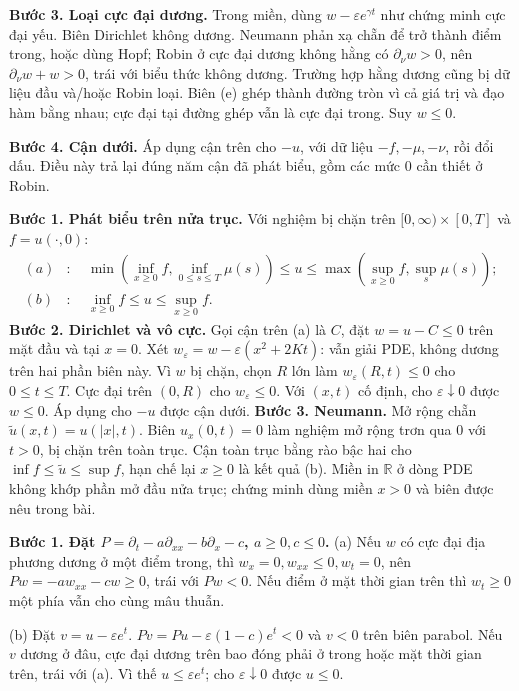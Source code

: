 \textbf{Bước 3. Loại cực đại dương.} Trong miền, dùng $w-\varepsilon e^{\gamma t}$ như chứng minh cực đại yếu. Biên Dirichlet không dương. Neumann phản xạ chẵn để trở thành điểm trong, hoặc dùng Hopf; Robin ở cực đại dương không hằng có $\partial_\nu w>0$, nên $\partial_\nu w+w>0$, trái với biểu thức không dương. Trường hợp hằng dương cũng bị dữ liệu đầu và/hoặc Robin loại. Biên (e) ghép thành đường tròn vì cả giá trị và đạo hàm bằng nhau; cực đại tại đường ghép vẫn là cực đại trong. Suy $w\le0$.

\textbf{Bước 4. Cận dưới.} Áp dụng cận trên cho $-u$, với dữ liệu $-f,-\mu,-\nu$, rồi đổi dấu. Điều này trả lại đúng năm cận đã phát biểu, gồm các mức $0$ cần thiết ở Robin.

\textbf{Bước 1. Phát biểu trên nửa trục.} Với nghiệm bị chặn trên $[0,\infty)\times[0,T]$ và $f=u(\cdot,0)$:
\begin{align*}
(a)&:\quad \min(\inf_{x\ge0}f,\inf_{0\le s\le T}\mu(s))
\le u\le\max(\sup_{x\ge0}f,\sup_s\mu(s));\\
(b)&:\quad \inf_{x\ge0}f\le u\le\sup_{x\ge0}f.
\end{align*}
\textbf{Bước 2. Dirichlet và vô cực.} Gọi cận trên (a) là $C$, đặt $w=u-C\le0$ trên mặt đầu và tại $x=0$. Xét $w_\varepsilon=w-\varepsilon(x^2+2Kt)$: vẫn giải PDE, không dương trên hai phần biên này. Vì $w$ bị chặn, chọn $R$ lớn làm $w_\varepsilon(R,t)\le0$ cho $0\le t\le T$. Cực đại trên $(0,R)$ cho $w_\varepsilon\le0$. Với $(x,t)$ cố định, cho $\varepsilon\downarrow0$ được $w\le0$. Áp dụng cho $-u$ được cận dưới.
\textbf{Bước 3. Neumann.} Mở rộng chẵn $\widetilde u(x,t)=u(|x|,t)$. Biên $u_x(0,t)=0$ làm nghiệm mở rộng trơn qua $0$ với $t>0$, bị chặn trên toàn trục. Cận toàn trục bằng rào bậc hai cho $\inf f\le\widetilde u\le\sup f$, hạn chế lại $x\ge0$ là kết quả (b).
Miền in $\mathbb R$ ở dòng PDE không khớp phần mở đầu nửa trục; chứng minh dùng miền $x>0$ và biên được nêu trong bài.

\textbf{Bước 1. Đặt $P=\partial_t-a\partial_{xx}-b\partial_x-c$, $a\ge0,c\le0$.}
(a) Nếu $w$ có cực đại địa phương dương ở một điểm trong, thì $w_x=0,w_{xx}\le0,w_t=0$, nên $Pw=-aw_{xx}-cw\ge0$, trái với $Pw<0$. Nếu điểm ở mặt thời gian trên thì $w_t\ge0$ một phía vẫn cho cùng mâu thuẫn.

(b) Đặt $v=u-\varepsilon e^t$. $Pv=Pu-\varepsilon(1-c)e^t<0$ và $v<0$ trên biên parabol. Nếu $v$ dương ở đâu, cực đại dương trên bao đóng phải ở trong hoặc mặt thời gian trên, trái với (a). Vì thế $u\le\varepsilon e^t$; cho $\varepsilon\downarrow0$ được $u\le0$.

